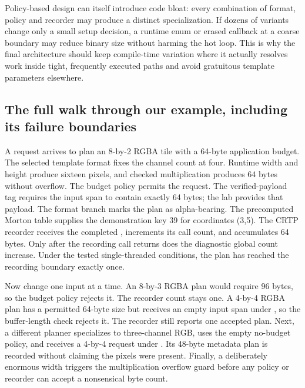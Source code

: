 Policy-based design can itself introduce code bloat: every combination of format, policy and recorder may produce a distinct specialization. If dozens of variants change only a small setup decision, a runtime enum or erased callback at a coarse boundary may reduce binary size without harming the hot loop. This is why the final architecture should keep compile-time variation where it actually resolves work inside tight, frequently executed paths and avoid gratuitous template parameters elsewhere.

\subsection{The full walk through our example, including its failure boundaries}\label{01-foundations-i-ch005-the-full-walk-through-our-example-including-its-failure-boundaries}

\hypertarget{01-foundations-i-ch005-the-full-walk-through-our-example-including-its-failure-boundaries}{}

A request arrives to plan an 8-by-2 RGBA tile with a 64-byte application budget. The selected template format fixes the channel count at four. Runtime width and height produce sixteen pixels, and checked multiplication produces 64 bytes without overflow. The budget policy permits the request. The verified-payload tag requires the input span to contain exactly 64 bytes; the lab provides that payload. The  format branch marks the plan as alpha-bearing. The precomputed Morton table supplies the demonstration key 39 for coordinates (3,5). The CRTP recorder receives the completed , increments its call count, and accumulates 64 bytes. Only after the recording call returns does the diagnostic global count increase. Under the tested single-threaded conditions, the plan has reached the recording boundary exactly once.

Now change one input at a time. An 8-by-3 RGBA plan would require 96 bytes, so the budget policy rejects it. The recorder count stays one. A 4-by-4 RGBA plan has a permitted 64-byte size but receives an empty input span under , so the buffer-length check rejects it. The recorder still reports one accepted plan. Next, a different planner specializes to three-channel RGB, uses the empty no-budget policy, and receives a 4-by-4 request under . Its 48-byte metadata plan is recorded without claiming the pixels were present. Finally, a deliberately enormous width triggers the multiplication overflow guard before any policy or recorder can accept a nonsensical byte count.

